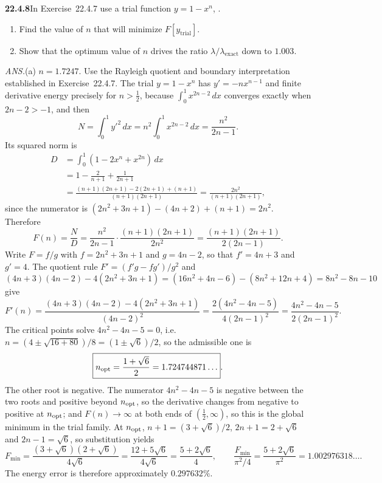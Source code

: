 \par\bigskip
\noindent\textbf{22.4.8}\quad In Exercise~22.4.7 use a trial
function $y=1-x^{n}$, .
\begin{enumerate}
\item[(a)] Find the value of $n$ that will minimize
$F[y_{\text{trial}}]$.
\item[(b)] Show that the optimum value of $n$ drives the ratio
$\lambda/\lambda_{\text{exact}}$ down to $1.003$.
\end{enumerate}
\par\nobreak\hfill\emph{ANS.}\enspace(a) $n=1.7247$.
\solution
Use the Rayleigh quotient and boundary interpretation established in
Exercise~22.4.7.  The trial $y=1-x^n$ has $y'=-nx^{n-1}$ and finite
derivative energy precisely for $n>\tfrac12$, because
$\int_0^1x^{2n-2}\,dx$ converges exactly when $2n-2>-1$, and then
\[
 N=\int_0^1y'^2\,dx
   =n^2\int_0^1x^{2n-2}\,dx=\frac{n^2}{2n-1}.
\]
Its squared norm is
\begin{align*}
 D&=\int_0^1(1-2x^n+x^{2n})\,dx\\
  &=1-\frac2{n+1}+\frac1{2n+1}\\
  &=\frac{(n+1)(2n+1)-2(2n+1)+(n+1)}
          {(n+1)(2n+1)}
   =\frac{2n^2}{(n+1)(2n+1)},
\end{align*}
since the numerator is $(2n^2+3n+1)-(4n+2)+(n+1)=2n^2$.
Therefore
\[
 F(n)=\frac ND=\frac{n^2}{2n-1}\cdot\frac{(n+1)(2n+1)}{2n^2}
 =\frac{(n+1)(2n+1)}{2(2n-1)}.
\]
Write $F=f/g$ with $f=2n^2+3n+1$ and $g=4n-2$, so that $f'=4n+3$ and
$g'=4$. The quotient rule $F'=(f'g-fg')/g^2$ and
$(4n+3)(4n-2)-4(2n^2+3n+1)=(16n^2+4n-6)-(8n^2+12n+4)=8n^2-8n-10$ give
\[
 F'(n)
 =\frac{(4n+3)(4n-2)-4(2n^2+3n+1)}{(4n-2)^2}
 =\frac{2(4n^2-4n-5)}{4(2n-1)^2}
 =\frac{4n^2-4n-5}{2(2n-1)^2}.
\]
The critical points solve $4n^2-4n-5=0$, i.e.
$n=(4\pm\sqrt{16+80})/8=(1\pm\sqrt6)/2$, so the admissible one is
\[
 \boxed{n_{\rm opt}=\frac{1+\sqrt6}{2}
       =1.724744871\ldots}.
\]
The other root is negative.  The numerator $4n^2-4n-5$ is negative
between the two roots and positive beyond $n_{\rm opt}$, so the
derivative changes from negative to positive at $n_{\rm opt}$; and
$F(n)\to\infty$ at both ends of $(\tfrac12,\infty)$, so this is the
global minimum in the trial family. At $n_{\rm opt}$,
$n+1=(3+\sqrt6)/2$, $2n+1=2+\sqrt6$ and $2n-1=\sqrt6$, so substitution
yields
\[
 F_{\min}=\frac{(3+\sqrt6)(2+\sqrt6)}{4\sqrt6}
 =\frac{12+5\sqrt6}{4\sqrt6}
 =\frac{5+2\sqrt6}{4},\qquad
 \boxed{\frac{F_{\min}}{\pi^2/4}
 =\frac{5+2\sqrt6}{\pi^2}=1.002976318\ldots}.
\]
The energy error is therefore approximately $0.297632\%$.

